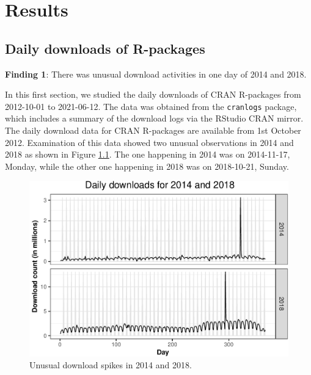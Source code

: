 \documentclass[
]{book}
\newenvironment{discovery}[1]{%
  \begin{tcolorbox}[colback=blue!30,colframe=blue!80!black]#1}{\end{tcolorbox}}
\begin{document}
\hypertarget{results}{%
\chapter{Results}\label{results}}

\hypertarget{daily-downloads-of-r-packages}{%
\section{Daily downloads of R-packages}\label{daily-downloads-of-r-packages}}

\begin{discovery}
\textbf{Finding 1}: There was unusual download activities in one day of
2014 and 2018.
\end{discovery}

In this first section, we studied the daily downloads of CRAN R-packages from 2012-10-01 to 2021-06-12. The data was obtained from the \texttt{cranlogs} package\citep{cranlogs}, which includes a summary of the download logs via the RStudio CRAN mirror. The daily download data for CRAN R-packages are available from 1st October 2012. Examination of this data showed two unusual observations in 2014 and 2018 as shown in Figure \ref{fig:unusual-spikes}. The one happening in 2014 was on 2014-11-17, Monday, while the other one happening in 2018 was on 2018-10-21, Sunday.



\begin{figure}

{\centering \includegraphics{figures/unusual-spikes-1} 

}

\caption{Unusual download spikes in 2014 and 2018.}\label{fig:unusual-spikes}
\end{figure}
\end{document}
